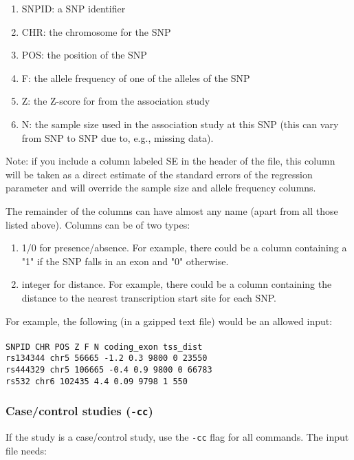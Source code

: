 \documentclass[11pt,titlepage]{article}
\begin{document}
\begin{enumerate}
\item SNPID: a SNP identifier
\item CHR: the chromosome for the SNP
\item POS: the position of the SNP
\item F: the allele frequency of one of the alleles of the SNP
\item Z: the Z-score for from the association study
\item N: the sample size used in the association study at this SNP (this can vary from SNP to SNP due to, e.g., missing data).
\end{enumerate}

Note: if you include a column labeled SE in the header of the file, this column will be taken as a direct estimate of the standard errors of the regression parameter and will override the sample size and allele frequency columns. 

The remainder of the columns can have almost any name (apart from all those listed above). Columns can be of two types:

\begin{enumerate}
\item 1/0 for presence/absence. For example, there could be a column containing a "1" if the SNP falls in an exon and "0" otherwise.
\item integer for distance. For example, there could be a column containing the distance to the nearest transcription start site for each SNP.
\end{enumerate}

\noindent For example, the following (in a gzipped text file) would be an allowed input:
\\
\\
\noindent \texttt{SNPID CHR POS Z F N coding\_exon tss\_dist}\\
\texttt{rs134344 chr5 56665 -1.2 0.3 9800 0 23550}\\
\texttt{rs444329 chr5 106665 -0.4 0.9 9800 0 66783}\\
\texttt{rs532 chr6 102435 4.4 0.09 9798 1 550}

\subsubsection{Case/control studies (\texttt{-cc})}\label{cc}
If the study is a case/control study, use the \texttt{-cc} flag for all commands. The input file needs:
\end{document}
